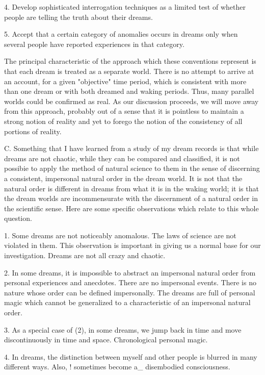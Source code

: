 \documentclass[10pt,twoside]{memoir}
\begin{document}
\begin{enumerate}
{\begin{enumerate}
\begin{sysrules}
\begin{sysrules}
\begin{sysrules}
\begin{sysrules}
{\begin{enumerate}
{{{{{{{4. Develop sophisticated interrogation techniques as a limited test of 
whether people are telling the truth about their dreams. 


5. Accept that a certain category of anomalies occurs in dreams only when 
several people have reported experiences in that category. 

The principal characteristic of the approach which these conventions 
represent is that each dream is treated as a separate world. There is no 
attempt to arrive at an account, for a given "objective" time period, which is 
consistent with more than one dream or with both dreamed and waking 
periods. Thus, many parallel worlds could be confirmed as real. As our 
discussion proceeds, we will move away from this approach, probably out of 
a sense that it is pointless to maintain a strong notion of reality and yet to 
forego the notion of the consistency of all portions of reality. 

C. Something that I have learned from a study of my dream records is 
that while dreams are not chaotic, while they can be compared and 
classified, it is not possibie to apply the method of natural science to them in 
the sense of discerning a consistent, impersonal natural order in the dream 
world. It is not that the natural order is different in dreams from what it is in 
the waking world; it is that the dream worlds are incommensurate with the 
discernment of a natural order in the scientific sense. Here are some specific 
observations which relate to this whole question. 

1. Some dreams are not noticeably anomalous. The laws of science are not 
violated in them. This observation is important in giving us a normal base for 
our investigation. Dreams are not all crazy and chaotic. 

2. In some dreams, it is impossible to abstract an impersonal natural order 
from personal experiences and anecdotes. There are no impersonal events. 
There is no nature whose order can be defined impersonally. The dreams are 
full of personal magic which cannot be generalized to a characteristic of an 
impersonal natural order. 

3. As a special case of (2), in some dreams, we jump back in time and move 
discontinuously in time and space. Chronological personal magic. 

4. In dreams, the distinction between myself and other people is blurred in 
many different ways. Also, ! sometimes become a_ disembodied 
consciousness. 

}}}}}}}
\end{enumerate}}
\end{sysrules}
\end{sysrules}
\end{sysrules}
\end{sysrules}
\end{enumerate}}
\end{enumerate}
\end{document}
